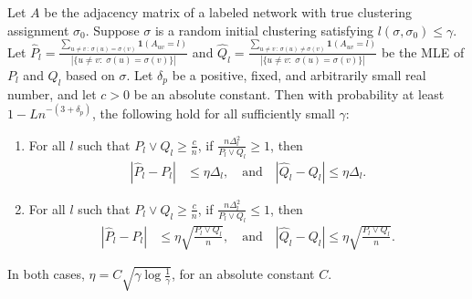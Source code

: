 \documentclass{article}
\begin{document}
\begin{proposition}
\label{prop:estimation_consistency}
Let $A$ be the adjacency matrix of a labeled network with true clustering assignment $\sigma_0$. Suppose $\sigma$ is a random initial clustering satisfying $l(\sigma, \sigma_0) \leq \gamma $. Let $\hat{P}_l = \frac{\sum_{u \neq v \,:\, \sigma(u)=\sigma(v)} \mathbf{1}(A_{uv} = l) }
                      {|\{u \neq v: \; \sigma(u) = \sigma(v)\}|}$ and
    $\hat{Q}_l = \frac{\sum_{u \neq v \,:\, \sigma(u) \neq \sigma(v)} \mathbf{1}(A_{uv} = l) }
                      {|\{u \neq v: \; \sigma(u) = \sigma(v)\}|}$ be the MLE of $P_l$ and $Q_l$ based on $\sigma$. Let $\delta_p$ be a positive, fixed, and arbitrarily small real number, and let $c > 0$ be an absolute constant. Then with probability at least $1 - L n^{-(3 + \delta_p)}$, the following hold for all sufficiently small $\gamma$:
\begin{enumerate}
\item For all $l$ such that $P_l \vee Q_l \geq \frac{c}{n}$, if $\frac{n \Delta_l^2}{P_l \vee Q_l} \geq 1$, then
\begin{align*}
 | \hat{P}_l - P_l | &\leq \eta \Delta_l, \quad \text{and} \quad | \hat{Q}_l - Q_l | \leq \eta \Delta_l. 
\end{align*}
\item For all $l$ such that $P_l \vee Q_l \geq \frac{c}{n}$, if $\frac{n \Delta_l^2}{P_l \vee Q_l} \leq 1$, then
\begin{align*}
 | \hat{P}_l - P_l | &\leq \eta \sqrt{ \frac{P_l \vee Q_l}{n}}, \quad \text{and} \quad | \hat{Q}_l - Q_l | \leq \eta \sqrt{ \frac{P_l \vee Q_l}{n}}.
\end{align*}
\end{enumerate}
In both cases,  $\eta = C \sqrt{\gamma \log \frac{1}{\gamma}}$, for an absolute constant $C$.
\end{proposition}
\end{document}

